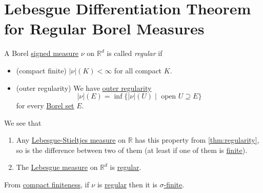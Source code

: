 \section{Lebesgue Differentiation Theorem for Regular Borel Measures}
\begin{definition}[Regular]\label{def:regular}
	A Borel \hyperref[def:signed-measure]{signed measure} \(\nu\) on \(\mathbb{R}^d\) is called \emph{regular} if
	\begin{itemize}
		\item\label{def:regular-compact-finite} (compact finite) \(\left\vert \nu \right\vert(K) < \infty\) for all compact \(K\).
		\item\label{def:regular-outer-regularity} (outer regularity) We have \hyperref[thm:regularity]{outer regularity}
		      \[
			      \left\vert \nu \right\vert(E) = \inf\{\left\vert \nu \right\vert(U) \mid \text{ open } U \supseteq E\}
		      \]
		      for every \hyperref[def:Borel-set]{Borel set} \(E\).
	\end{itemize}
\end{definition}

\begin{eg}
	We see that
	\begin{enumerate}[(1)]
		\item Any \hyperref[def:Lebesgue-Stieltjes-measure]{Lebesgue-Stieltjes measure} on \(\mathbb{R}\) has this property from \autoref{thm:regularity},
		      so is the difference between two of them (at least if one of them is \hyperref[def:finite-signed-measure]{finite}).
		\item The \hyperref[def:Lebesgue-measure]{Lebesgue measure} on \(\mathbb{R}^d\) is \hyperref[def:regular]{regular}.
	\end{enumerate}
\end{eg}

\begin{note}
	From \hyperref[def:regular-compact-finite]{compact finiteness}, if \(\nu\) is \hyperref[def:regular]{regular} then it is
	\hyperref[def:finite-signed-measure]{\(\sigma\)-finite}.
\end{note}

